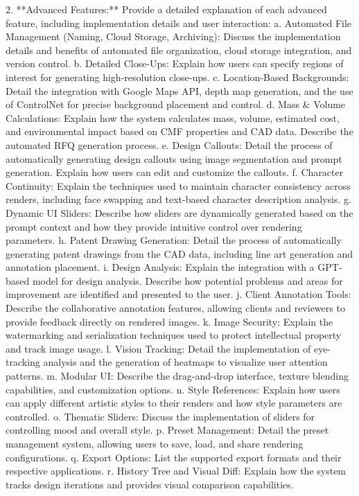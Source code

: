 \documentclass{article}
\begin{document}
      2.  **Advanced Features:**  Provide a detailed explanation of each advanced feature, including implementation details and user interaction:
         a. Automated File Management (Naming, Cloud Storage, Archiving): Discuss the implementation details and benefits of automated file organization, cloud storage integration, and version control.
         b. Detailed Close-Ups: Explain how users can specify regions of interest for generating high-resolution close-ups.
         c. Location-Based Backgrounds: Detail the integration with Google Maps API, depth map generation, and the use of ControlNet for precise background placement and control.
         d. Mass \& Volume Calculations:  Explain how the system calculates mass, volume, estimated cost, and environmental impact based on CMF properties and CAD data.  Describe the automated RFQ generation process.
         e. Design Callouts: Detail the process of automatically generating design callouts using image segmentation and prompt generation.  Explain how users can edit and customize the callouts.
         f. Character Continuity:  Explain the techniques used to maintain character consistency across renders, including face swapping and text-based character description analysis.
         g. Dynamic UI Sliders: Describe how sliders are dynamically generated based on the prompt context and how they provide intuitive control over rendering parameters.
         h. Patent Drawing Generation: Detail the process of automatically generating patent drawings from the CAD data, including line art generation and annotation placement.
         i. Design Analysis:  Explain the integration with a GPT-based model for design analysis.  Describe how potential problems and areas for improvement are identified and presented to the user.
         j. Client Annotation Tools: Describe the collaborative annotation features, allowing clients and reviewers to provide feedback directly on rendered images.
         k. Image Security:  Explain the watermarking and serialization techniques used to protect intellectual property and track image usage.
         l. Vision Tracking: Detail the implementation of eye-tracking analysis and the generation of heatmaps to visualize user attention patterns.
         m. Modular UI:  Describe the drag-and-drop interface, texture blending capabilities, and customization options.
         n. Style References: Explain how users can apply different artistic styles to their renders and how style parameters are controlled.
         o. Thematic Sliders: Discuss the implementation of sliders for controlling mood and overall style.
         p. Preset Management: Detail the preset management system, allowing users to save, load, and share rendering configurations.
         q. Export Options:  List the supported export formats and their respective applications.
         r. History Tree and Visual Diff: Explain how the system tracks design iterations and provides visual comparison capabilities.
\end{document}
